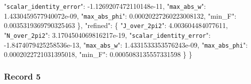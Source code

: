 \documentclass[
  10pt,
]{article}
\newenvironment{Shaded}{}{}
\newcommand{\DataTypeTok}[1]{\textcolor[rgb]{0.56,0.13,0.00}{#1}}
\newcommand{\FloatTok}[1]{\textcolor[rgb]{0.25,0.63,0.44}{#1}}
\newcommand{\FunctionTok}[1]{\textcolor[rgb]{0.02,0.16,0.49}{#1}}
\begin{document}
\begin{Shaded}
\begin{Highlighting}[]
    \DataTypeTok{"\nolinkurl{scalar_identity_error}"}\FunctionTok{:} \FloatTok{{-}1.1269207472110148e{-}11}\FunctionTok{,}
    \DataTypeTok{"\nolinkurl{max_abs_w}"}\FunctionTok{:} \FloatTok{1.4330459577940072e{-}09}\FunctionTok{,}
    \DataTypeTok{"\nolinkurl{max_abs_phi}"}\FunctionTok{:} \FloatTok{0.00020227260223008132}\FunctionTok{,}
    \DataTypeTok{"min\_F"}\FunctionTok{:} \FloatTok{0.0035319369790325463}
  \FunctionTok{\},}
  \DataTypeTok{"refined"}\FunctionTok{:} \FunctionTok{\{}
    \DataTypeTok{"\nolinkurl{J_over_2pi2}"}\FunctionTok{:} \FloatTok{4.003604484077611}\FunctionTok{,}
    \DataTypeTok{"\nolinkurl{N_over_2pi2}"}\FunctionTok{:} \FloatTok{3.1704504069816217e{-}19}\FunctionTok{,}
    \DataTypeTok{"\nolinkurl{scalar_identity_error}"}\FunctionTok{:} \FloatTok{{-}1.8474079425258536e{-}13}\FunctionTok{,}
    \DataTypeTok{"\nolinkurl{max_abs_w}"}\FunctionTok{:} \FloatTok{1.4331533353576243e{-}09}\FunctionTok{,}
    \DataTypeTok{"\nolinkurl{max_abs_phi}"}\FunctionTok{:} \FloatTok{0.0002022721031395018}\FunctionTok{,}
    \DataTypeTok{"min\_F"}\FunctionTok{:} \FloatTok{0.0005083135557331598}
  \FunctionTok{\}}
\FunctionTok{\}}
\end{Highlighting}
\end{Shaded}

\hypertarget{record-5-1}{%
\subsubsection{Record 5}\label{record-5-1}}
\end{document}
